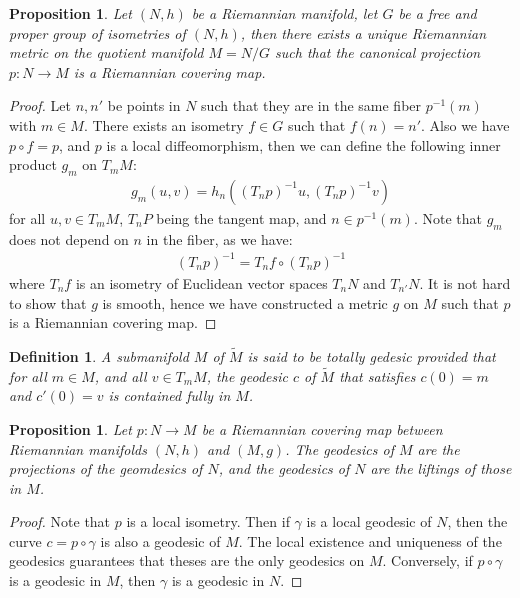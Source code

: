 \documentclass[11pt]{book}
\theoremstyle{break}
\theoremstyle{break}
\newtheorem{prop}[lem]{Proposition}
\newtheorem{defn}{Definition}[corL]
\newcommand{\that}[1]{\widetilde{#1}}
\begin{document}
\begin{prop}
Let $(N,h)$ be a Riemannian manifold, let $G$ be a free and proper group of isometries of $(N,h)$, then there exists a unique Riemannian metric on the quotient manifold $M = N/G$ such that the canonical projection $p:N \to M$ is a Riemannian covering map.  
\end{prop}
\begin{proof}
Let $n,n'$ be points in $N$ such that they are in the same fiber $p^{-1}(m)$ with $m \in M$. There exists an isometry $f \in G$ such that $f(n) = n'$. Also we have $p\circ f  = p$, and $p$ is a local diffeomorphism, then we can define the following inner product $g_m$ on $T_mM$:
\begin{align*}
g_m(u,v) = h_n\left((T_np)^{-1}u, (T_np)^{-1}v\right)
\end{align*}
for all $u ,v \in T_mM$, $T_nP$ being the tangent map, and $n \in p^{-1}(m)$. Note that $g_m$ does not depend on $n$ in the fiber, as we have:
\begin{align*}
(T_np)^{-1} = T_n f \circ (T_n p)^{-1}
\end{align*}
where $T_nf$ is an isometry of Euclidean vector spaces $T_{n}N$ and $T_{n'}N$. It is not hard to show that $g$ is smooth, hence we have constructed a metric $g$ on $M$ such that $p$ is a Riemannian covering map. 
\end{proof}






\newpage
\begin{defn}
A submanifold $M$ of $\that{M}$ is said to be totally gedesic provided that for all $m \in M$, and all $v \in T_mM$, the geodesic $c$ of $\that{M}$ that satisfies $c(0) = m$ and $c'(0) =v$ is contained fully in $M$. 
\end{defn}


\begin{prop}
Let $p:N \to M$ be a Riemannian covering map between Riemannian manifolds $(N,h)$ and $(M,g)$. The geodesics of $M$ are the projections of the geomdesics of $N$, and the geodesics of $N$ are the liftings of those in $M$.  
\end{prop}
\begin{proof}
Note that $p$ is a local isometry. Then if $\gamma$ is a local geodesic of $N$, then the curve $c= p\circ \gamma$ is also a geodesic of $M$. The local existence and uniqueness of the geodesics guarantees that theses are the only geodesics on $M$. Conversely, if $p\circ \gamma$ is a geodesic in $M$, then $\gamma$ is a geodesic in $N$.  
\end{proof}
\end{document}
